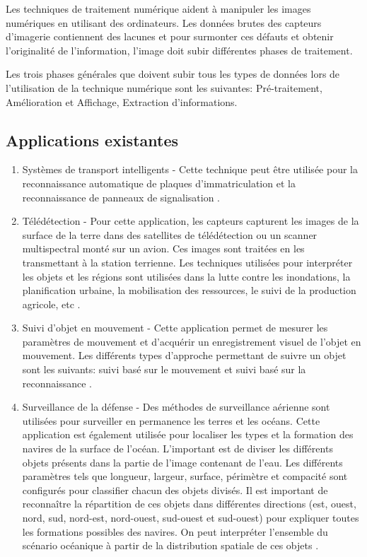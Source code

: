 \documentclass[12pt]{article}
\begin{document}
Les techniques de traitement numérique aident à manipuler les images numériques en utilisant des ordinateurs. Les données brutes des capteurs d'imagerie contiennent des lacunes et pour surmonter ces défauts et obtenir l’originalité de l’information, l’image doit subir différentes phases de traitement.

Les trois phases générales que doivent subir tous les types de données lors de l’utilisation de la technique numérique sont les suivantes: Pré-traitement, Amélioration et Affichage, Extraction d’informations.

\subsection{Applications existantes}
\begin{enumerate}
	\item Systèmes de transport intelligents - Cette technique peut être utilisée pour la reconnaissance automatique de plaques d'immatriculation et la reconnaissance de panneaux de signalisation \cite{15}.
	\item Télédétection - Pour cette application, les capteurs capturent les images de la surface de la terre dans des satellites de télédétection ou un scanner multispectral monté sur un avion. Ces images sont traitées en les transmettant à la station terrienne. Les techniques utilisées pour interpréter les objets et les régions sont utilisées dans la lutte contre les inondations, la planification urbaine, la mobilisation des ressources, le suivi de la production agricole, etc \cite{16}.
	\item Suivi d'objet en mouvement - Cette application permet de mesurer les paramètres de mouvement et d'acquérir un enregistrement visuel de l'objet en mouvement. Les différents types d’approche permettant de suivre un objet sont les suivants: suivi basé sur le mouvement et suivi basé sur la reconnaissance \cite{17}.
	\item Surveillance de la défense - Des méthodes de surveillance aérienne sont utilisées pour surveiller en permanence les terres et les océans. Cette application est également utilisée pour localiser les types et la formation des navires de la surface de l'océan. L'important est de diviser les différents objets présents dans la partie de l'image contenant de l'eau. Les différents paramètres tels que longueur, largeur, surface, périmètre et compacité sont configurés pour classifier chacun des objets divisés. Il est important de reconnaître la répartition de ces objets dans différentes directions (est, ouest, nord, sud, nord-est, nord-ouest, sud-ouest et sud-ouest) pour expliquer toutes les formations possibles des navires. On peut interpréter l'ensemble du scénario océanique à partir de la distribution spatiale de ces objets \cite{18}.

\end{enumerate}
\end{document}

